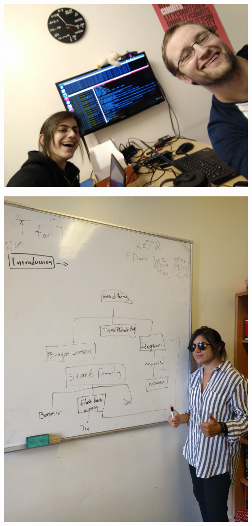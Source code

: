 \documentclass{beamer}
\begin{document}
    \begin{frame}
        \begin{center}
            \includegraphics[width=.8\textwidth]{static/nik_and_i.jpg}\\
        \end{center}
    \end{frame}

    \begin{frame}
        \begin{center}
                \includegraphics[height=.95\textheight]{static/whiteboard.jpg}\\
        \end{center}
    \end{frame}
\end{document}
